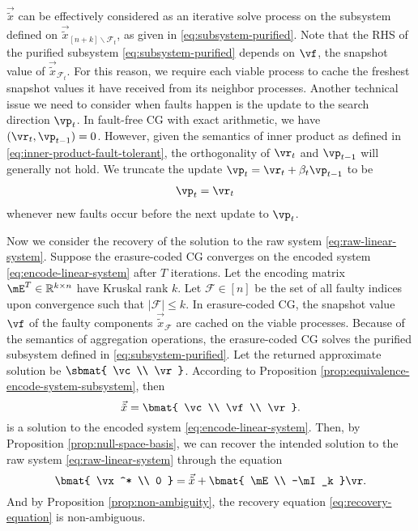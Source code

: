 \documentclass[11pt]{article}
\newcommand{\tx}{\vec{\tilde{x}}}
\newcommand{\sF}{{\mathcal{F}}}
\begin{document}
$\tx$ can be effectively considered as an iterative solve process on the subsystem
defined on $\tx_{[n+k]\backslash \sF_t}$, as given in \eqref{eq:subsystem-purified}.
Note that the RHS of the purified subsystem \eqref{eq:subsystem-purified} depends on
$\vf$, the snapshot value of $\tx_{\sF_t}$. For this reason, we require each viable
process to cache the freshest snapshot values it have received from its neighbor
processes. Another technical issue we need to consider when faults happen is the
update to the search direction $\vp_t$. In fault-free CG with exact arithmetic,
we have $(\vr_t,\vp_{t-1})=0$. However, given the semantics of inner product
as defined in \eqref{eq:inner-product-fault-tolerant}, the orthogonality of
$\vr_t$ and $\vp_{t-1}$ will generally not hold. We truncate the
update $\vp_t=\vr_t+\beta_t \vp_{t-1}$ to be
\begin{align*}
\vp_t &= \vr_t
\end{align*}
whenever new faults occur before the next update to $\vp_t$.


Now we consider the recovery of the solution to the raw system \eqref{eq:raw-linear-system}.
Suppose the erasure-coded CG converges on the encoded system \eqref{eq:encode-linear-system}
after $T$ iterations. Let the encoding matrix $\mE^T\in\mathbb{R}^{k\times n}$ have
Kruskal rank $k$. Let $\sF\in [n]$ be the set of all faulty indices upon convergence
such that $|\sF|\leq k$. In erasure-coded CG, the snapshot value $\vf$ of the faulty
components $\tx_{\sF}$ are cached on the viable processes. Because of the semantics of
aggregation operations, the erasure-coded CG solves the purified subsystem defined
in \eqref{eq:subsystem-purified}. Let the returned approximate solution be
$\sbmat{ \vc \\ \vr}$. According to Proposition \ref{prop:equivalence-encode-system-subsystem},
then \[ \tx = \bmat{ \vc \\ \vf \\ \vr }. \] is a solution to the encoded system
\eqref{eq:encode-linear-system}. Then, by Proposition \ref{prop:null-space-basis}, we can
recover the intended solution to the raw system \eqref{eq:raw-linear-system} through the
equation
\begin{equation} \label{eq:recovery-equation}
\bmat{ \vx^* \\ 0 } = \tx + \bmat{ \mE \\ -\mI_k } \vr. 
\end{equation}
And by Proposition \ref{prop:non-ambiguity}, the recovery equation \eqref{eq:recovery-equation} is non-ambiguous.
\end{document}

